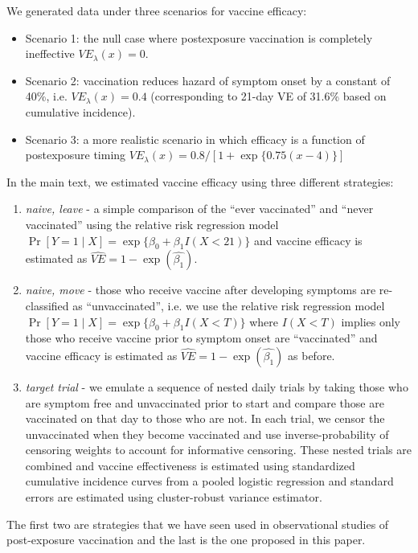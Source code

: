 \begin{appendix}
    We generated data under three scenarios for vaccine efficacy:
    \begin{itemize}
        \item Scenario 1: the null case where postexposure vaccination is completely ineffective $VE_\lambda(x) = 0$.
        \item Scenario 2: vaccination reduces hazard of symptom onset by a constant of 40\%, i.e. $VE_\lambda(x) = 0.4$ (corresponding to 21-day VE of 31.6\% based on cumulative incidence).
        \item Scenario 3: a more realistic scenario in which efficacy is a function of postexposure timing $VE_{\lambda}(x) = 0.8/[1+\exp\{0.75(x-4)\}]$
    \end{itemize}
    
    In the main text, we estimated vaccine efficacy using three different strategies:
    \begin{enumerate}
        \item \textit{naive, leave} - a simple comparison of the ``ever vaccinated'' and ``never vaccinated'' using the relative risk regression model $\Pr[Y = 1 \mid X] = \operatorname{exp}\{\beta_0 + \beta_1 I(X < 21)\}$ and vaccine efficacy is estimated as $\widehat{VE} = 1 - \exp(\widehat{\beta_1})$.
        \item \textit{naive, move} - those who receive vaccine after developing symptoms are re-classified as ``unvaccinated'', i.e. we use the relative risk regression model $\Pr[Y = 1 \mid X] = \operatorname{exp}\{\beta_0 + \beta_1 I(X < T)\}$ where $I(X<T)$ implies only those who receive vaccine prior to symptom onset are ``vaccinated'' and vaccine efficacy is estimated as $\widehat{VE} = 1 - \exp(\widehat{\beta_1})$ as before.
        \item \textit{target trial} - we emulate a sequence of nested daily trials by taking those who are symptom free and unvaccinated prior to start and compare those are vaccinated on that day to those who are not. In each trial, we censor the unvaccinated when they become vaccinated and use inverse-probability of censoring weights to account for informative censoring. These nested trials are combined and vaccine effectiveness is estimated using standardized cumulative incidence curves from a pooled logistic regression and standard errors are estimated using cluster-robust variance estimator.
    \end{enumerate}
    The first two are strategies that we have seen used in observational studies of post-exposure vaccination and the last is the one proposed in this paper.


\end{appendix}

